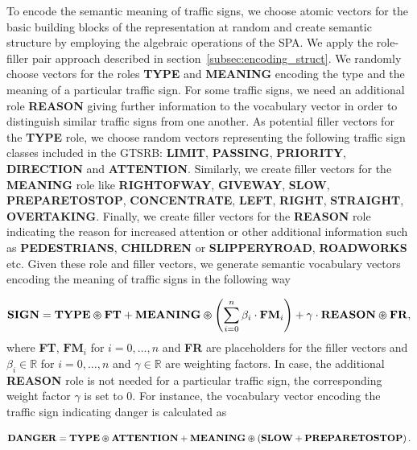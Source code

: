To encode the semantic meaning of traffic signs, we choose atomic vectors for the basic building blocks of the representation at random and create semantic structure by employing the algebraic operations of the \ac{SPA}.
We apply the role-filler pair approach described in section~\ref{subsec:encoding_struct}.
We randomly choose vectors for the roles \textbf{TYPE} and \textbf{MEANING} encoding the type and the meaning of a particular traffic sign.
For some traffic signs, we need an additional role \textbf{REASON} giving further information to the vocabulary vector in order to distinguish similar traffic signs from one another.
As potential filler vectors for the \textbf{TYPE} role, we choose random vectors representing the following traffic sign classes included in the \ac{GTSRB}: \textbf{LIMIT}, \textbf{PASSING}, \textbf{PRIORITY}, \textbf{DIRECTION} and \textbf{ATTENTION}.
Similarly, we create filler vectors for the \textbf{MEANING} role like \textbf{RIGHTOFWAY}, \textbf{GIVEWAY}, \textbf{SLOW}, \textbf{PREPARETOSTOP}, \textbf{CONCENTRATE}, \textbf{LEFT}, \textbf{RIGHT}, \textbf{STRAIGHT}, \textbf{OVERTAKING}.
Finally, we create filler vectors for the \textbf{REASON} role indicating the reason for increased attention or other additional information such as \textbf{PEDESTRIANS}, \textbf{CHILDREN} or \textbf{SLIPPERYROAD}, \textbf{ROADWORKS} etc.
Given these role and filler vectors, we generate semantic vocabulary vectors encoding the meaning of traffic signs in the following way

\begin{equation}
    \label{eq:semantic_vocab_traffic_signs}
    \mathbf{SIGN} = \mathbf{TYPE} \varoast \mathbf{FT} + \mathbf{MEANING} \varoast \left( \sum\limits_{i=0}^{n} \beta_{i} \cdot  \mathbf{FM}_{i}  \right) + \gamma \cdot \mathbf{REASON} \varoast \mathbf{FR}, 
\end{equation}
where \textbf{FT}, $\mathbf{FM}_{i}$ for $i = 0, \ldots, n$ and \textbf{FR} are placeholders for the filler vectors and $\beta_{i} \in \mathbb{R} $ for $i = 0, \ldots, n$ and $\gamma \in \mathbb{R} $ are weighting factors.
In case, the additional \textbf{REASON} role is not needed for a particular traffic sign, the corresponding weight factor $\gamma$ is set to \num{0}.
For instance, the vocabulary vector encoding the traffic sign indicating danger is calculated as

\begin{equation}
\label{eq:semantic_vocab_traffic_sign_example}
\mathbf{DANGER} = \mathbf{TYPE} \varoast \mathbf{ATTENTION} + \mathbf{MEANING} \varoast  \left(\mathbf{SLOW} + \mathbf{PREPARETOSTOP}\right).
\end{equation}

